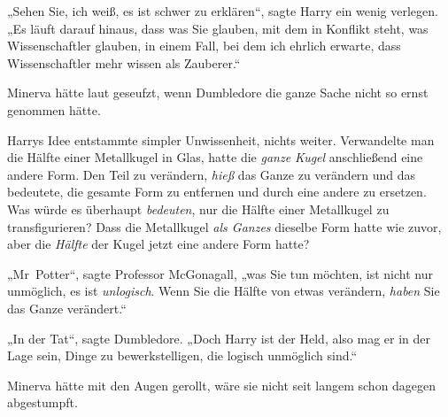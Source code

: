 „Sehen Sie, ich weiß, es ist schwer zu erklären“, sagte Harry ein wenig verlegen. „Es läuft darauf hinaus, dass was Sie glauben, mit dem in Konflikt steht, was Wissenschaftler glauben, in einem Fall, bei dem ich ehrlich erwarte, dass Wissenschaftler mehr wissen als Zauberer.“

Minerva hätte laut geseufzt, wenn Dumbledore die ganze Sache nicht so ernst genommen hätte.

Harrys Idee entstammte simpler Unwissenheit, nichts weiter. Verwandelte man die Hälfte einer Metallkugel in Glas, hatte die \emph{ganze Kugel} anschließend eine andere Form. Den Teil zu verändern, \emph{hieß} das Ganze zu verändern und das bedeutete, die gesamte Form zu entfernen und durch eine andere zu ersetzen. Was würde es überhaupt \emph{bedeuten}, nur die Hälfte einer Metallkugel zu transfigurieren? Dass die Metallkugel \emph{als Ganzes} dieselbe Form hatte wie zuvor, aber die \emph{Hälfte} der Kugel jetzt eine andere Form hatte?

„Mr~Potter“, sagte Professor McGonagall, „was Sie tun möchten, ist nicht nur unmöglich, es ist \emph{unlogisch}. Wenn Sie die Hälfte von etwas verändern, \emph{haben} Sie das Ganze verändert.“

„In der Tat“, sagte Dumbledore. „Doch Harry ist der Held, also mag er in der Lage sein, Dinge zu bewerkstelligen, die logisch unmöglich sind.“

Minerva hätte mit den Augen gerollt, wäre sie nicht seit langem schon dagegen abgestumpft.

